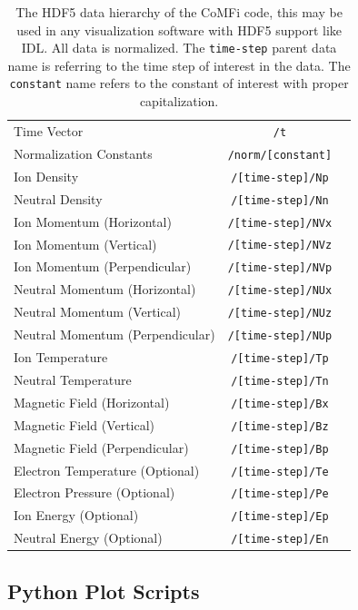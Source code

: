 \documentclass[12pt,upcase]{umlthesis}
\def\code#1{\texttt{#1}}
\begin{document}
\begin{table}[h]\label{tab:datahierarchy}
\centering
\caption[CoMFi.hdf5 data hierarchy]{The HDF5 data hierarchy of the CoMFi code, this may be used in any visualization software with HDF5 support like IDL\@. All data is normalized. The \code{time-step} parent data name is referring to the time step of interest in the data. The \code{constant} name refers to the constant of interest with proper capitalization.}
\begin{tabular}[]{l  c  r}
	\toprule
	Time Vector & \code{/t} \\
	Normalization Constants & \code{/norm/[constant]} \\
	Ion Density & \code{/[time-step]/Np} \\
	Neutral Density & \code{/[time-step]/Nn} \\
	Ion Momentum (Horizontal) & \code{/[time-step]/NVx} \\
	Ion Momentum (Vertical) & \code{/[time-step]/NVz} \\
	Ion Momentum (Perpendicular) & \code{/[time-step]/NVp} \\
	Neutral Momentum (Horizontal) & \code{/[time-step]/NUx} \\
	Neutral Momentum (Vertical) & \code{/[time-step]/NUz} \\
	Neutral Momentum (Perpendicular) & \code{/[time-step]/NUp} \\
	Ion Temperature & \code{/[time-step]/Tp} \\
	Neutral Temperature & \code{/[time-step]/Tn} \\
	Magnetic Field (Horizontal) & \code{/[time-step]/Bx} \\
	Magnetic Field (Vertical) & \code{/[time-step]/Bz} \\
	Magnetic Field (Perpendicular) & \code{/[time-step]/Bp} \\
	Electron Temperature (Optional) & \code{/[time-step]/Te} \\
	Electron Pressure (Optional) & \code{/[time-step]/Pe} \\
	Ion Energy (Optional) & \code{/[time-step]/Ep} \\
	Neutral Energy (Optional) & \code{/[time-step]/En} \\
	\bottomrule
\end{tabular}
\end{table}

\subsection{Python Plot Scripts}
\end{document}
